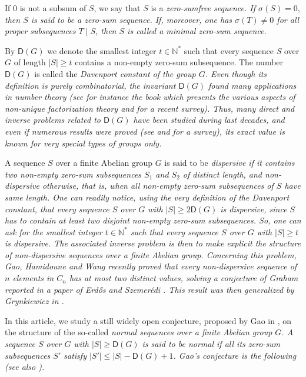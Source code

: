 \documentclass[english,12pt,a4paper,twoside]{smfart}
\theoremstyle{plain}
\theoremstyle{definition}
\theoremstyle{remark}
\begin{document}
\noindent If $0$ is not a subsum of $S$, we say that $S$ is a \em zero-sumfree sequence\em. If $\sigma(S)=0,$ then $S$ is said to be a \em zero-sum sequence\em. 
If, moreover, one has $\sigma(T) \neq 0$ for all proper subsequences $T \mid S$, then $S$ is called a \em minimal zero-sum sequence\em.

\medskip
By $\mathsf{D}(G)$ we denote the smallest integer $t \in \mathbb{N}^*$ such that every sequence $S$ over $G$ of length $|S| \geq t$ contains a non-empty zero-sum subsequence. The number $\mathsf{D}(G)$ is called the \em Davenport constant \em of the group $G$. Even though its definition is purely combinatorial, the invariant $\mathsf{D}(G)$ found many applications in number theory (see for instance the book \cite{GeroKoch05} which presents the various aspects of non-unique factorization theory and \cite{GeroRuzsa09} for a recent survey). Thus, many direct and inverse problems related to $\mathsf{D}(G)$ have been studied during last decades, and even if numerous results were proved (see \cite[Chapter $5$]{GeroKoch05} and \cite{GaoGero06} for a survey), its exact value is known for very special types of groups only. 

\medskip
A sequence $S$ over a finite Abelian group $G$ is said to be \em dispersive \em if it contains two non-empty zero-sum subsequences $S_1$ and $S_2$ of distinct length, and \em non-dispersive \em otherwise, that is, when all non-empty zero-sum subsequences of $S$ have same length. One can readily notice, using the very definition of the Davenport constant, that every sequence $S$ over $G$ with $\left|S\right| \geq 2\mathsf{D}(G)$ is dispersive, since $S$ has to contain at least two disjoint non-empty zero-sum subsequences. So, one can ask for the smallest integer $t \in \mathbb{N}^*$ such that every sequence $S$ over $G$ with $|S| \geq t$ is dispersive. The associated inverse problem is then to make explicit the structure of non-dispersive sequences over a finite Abelian group. Concerning this problem, Gao, Hamidoune and Wang recently proved \cite{GaoHami09} that every non-dispersive sequence of $n$ elements in $C_n$ has at most two distinct values, solving a conjecture of Graham reported in a paper of Erd\H{o}s and Szemer\'{e}di \cite{ErdosSzemeredi76}. This result was then generalized by Grynkiewicz in \cite{Grynkie09}.

\medskip
In this article, we study a still widely open conjecture, proposed by Gao in \cite{Gao06}, on the structure of the so-called \em normal sequences \em over a finite Abelian group $G$. A sequence $S$ over $G$ with $\left|S\right| \geq \mathsf{D}(G)$ is said to be \em normal \em if all its zero-sum subsequences $S'$ satisfy $\left|S'\right| \leq \left|S\right|-\mathsf{D}(G) +1$. Gao's conjecture is the following (see also \cite[Conjecture $4.9$]{GaoGero06}).
\end{document}
